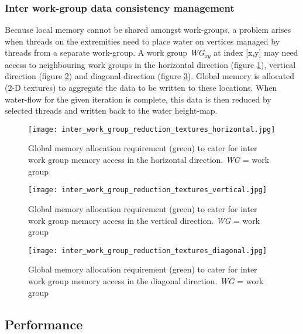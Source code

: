 \subsubsection{Inter work-group data consistency management}

Because local memory cannot be shared amongst work-groups, a problem arises when threads on the extremities need to place water on vertices managed by threads from a separate work-group. A work group \textit{WG$_{xy}$} at index [x,y] may need access to neighbouring work groups in the horizontal direction (figure \ref{fig:water_flow_inter_wg_reduc_horiz}), vertical direction (figure \ref{fig:water_flow_inter_wg_reduc_vert}) and diagonal direction (figure \ref{fig:water_flow_inter_wg_reduc_diag}). Global memory is allocated (2-D textures) to aggregate the data to be written to these locations. When water-flow for the given iteration is complete, this data is then reduced by selected threads and written back to the water height-map.

\begin{figure}
\center
	\texttt{[image: inter\_work\_group\_reduction\_textures\_horizontal.jpg]}
	\caption{ Global memory allocation requirement (green) to cater for inter work group memory access in the horizontal direction. \textit{WG} = work group}
	\label{fig:water_flow_inter_wg_reduc_horiz}
\end{figure}

\begin{figure}
\center
	\texttt{[image: inter\_work\_group\_reduction\_textures\_vertical.jpg]}
	\caption{ Global memory allocation requirement (green) to cater for inter work group memory access in the vertical direction. \textit{WG} = work group}
	\label{fig:water_flow_inter_wg_reduc_vert}
\end{figure}

\begin{figure}
\center
	\texttt{[image: inter\_work\_group\_reduction\_textures\_diagonal.jpg]}
	\caption{ Global memory allocation requirement (green) to cater for inter work group memory access in the diagonal direction. \textit{WG} = work group}
	\label{fig:water_flow_inter_wg_reduc_diag}
\end{figure}

\subsection{Performance}

